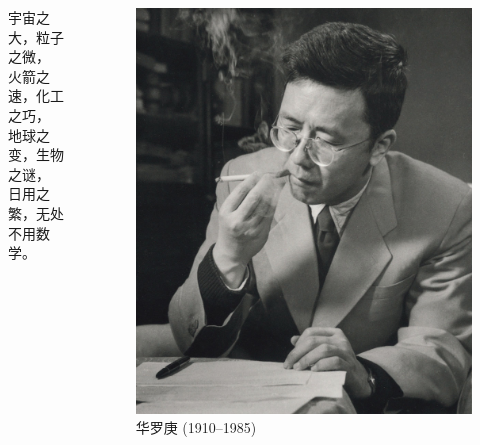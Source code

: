 \documentclass[13pt,punct]{ctexbeamer}
\begin{document}
\begin{frame}

\begin{columns}[c]  %

	\column{6cm}
\begin{leftline}
	{\Large  宇宙之大，粒子之微，} \\[8pt]

	{ \Large 火箭之速，化工之巧，}\\[8pt]

	{ \Large 地球之变，生物之谜，}\\[8pt]

	{ \Large 日用之繁，无处不用数学。}
\end{leftline}


	\column{5cm}
	\begin{figure}[p]
		\includegraphics[scale=0.5]{hua.jpg}
		\caption{华罗庚 (1910--1985)}
	\end{figure}

\end{columns}

\end{frame}
\end{document}
